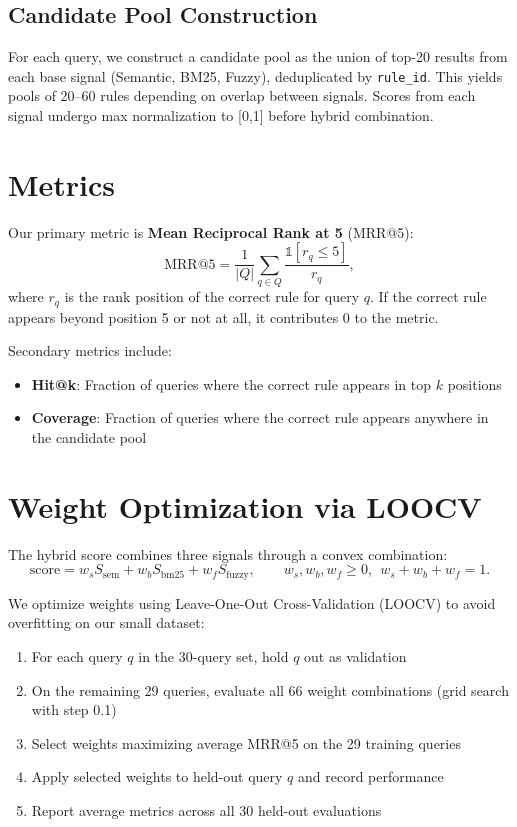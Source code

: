 \subsection{Candidate Pool Construction}

For each query, we construct a candidate pool as the union of top-20 results from each base signal (Semantic, BM25, Fuzzy), deduplicated by \texttt{rule\_id}. This yields pools of 20–60 rules depending on overlap between signals. Scores from each signal undergo max normalization to [0,1] before hybrid combination.

\section{Metrics}
\label{sec:evaluation-metrics}

Our primary metric is \textbf{Mean Reciprocal Rank at 5} (MRR@5):
\[
\mathrm{MRR@5}=\frac{1}{|Q|}\sum_{q\in Q} \frac{\mathbb{1}[r_q\le 5]}{r_q},
\]
where $r_q$ is the rank position of the correct rule for query $q$. If the correct rule appears beyond position 5 or not at all, it contributes 0 to the metric.

Secondary metrics include:
\begin{itemize}[leftmargin=*,itemsep=2pt,topsep=2pt]
  \item \textbf{Hit@k}: Fraction of queries where the correct rule appears in top $k$ positions
  \item \textbf{Coverage}: Fraction of queries where the correct rule appears anywhere in the candidate pool
\end{itemize}

\section{Weight Optimization via LOOCV}
\label{sec:evaluation-loocv}

The hybrid score combines three signals through a convex combination:
\[
\text{score} = w_s S_{\text{sem}} + w_b S_{\text{bm25}} + w_f S_{\text{fuzzy}},
\qquad w_s,w_b,w_f\ge 0,\ \ w_s+w_b+w_f=1.
\]

We optimize weights using Leave-One-Out Cross-Validation (LOOCV) to avoid overfitting on our small dataset:

\begin{enumerate}
  \item For each query $q$ in the 30-query set, hold $q$ out as validation
  \item On the remaining 29 queries, evaluate all 66 weight combinations (grid search with step 0.1)
  \item Select weights maximizing average MRR@5 on the 29 training queries
  \item Apply selected weights to held-out query $q$ and record performance
  \item Report average metrics across all 30 held-out evaluations
\end{enumerate}

